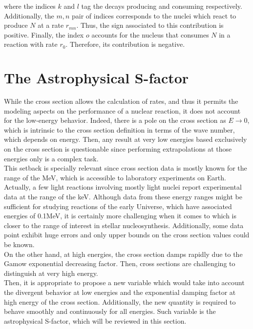 \documentclass[openany]{book}
\begin{document}
where the indices $k$ and $l$ tag the decays producing and consuming respectively. Additionally, the $m, n$ pair of indices corresponds to the nuclei which react to produce $N$ at a rate $r_{mn}$. Thus, the sign associated to this contribution is positive. Finally, the index $o$ accounts for the nucleus that consumes $N$ in a reaction with rate $r_0$. Therefore, its contribution is negative. \\


\section{The Astrophysical S-factor} \label{sec:sFactor}

While the cross section allows the calculation of rates, and thus it permits the modeling aspects on the performance of a nuclear reaction, it does not account for the low-energy behavior. Indeed, there is a pole on the cross section as $E \rightarrow 0$, which is intrinsic to the cross section definition in terms of the wave number, which depends on energy. Then, any result at very low energies based exclusively on the cross section is questionable since performing extrapolations at those energies only is a complex task. \\

This setback is specially relevant since cross section data is mostly known for the range of the MeV, which is accessible to laboratory experiments on Earth. Actually, a few light reactions involving mostly light nuclei report experimental data at the range of the keV. Although data from these energy ranges might be sufficient for studying reactions of the early Universe, which have associated energies of 0.1MeV, it is certainly more challenging when it comes to  which is closer to the range of interest in stellar nucleosynthesis. Additionally, some data point exhibit huge errors and only upper bounds on the cross section values could be known. \\

On the other hand, at high energies, the cross section damps rapidly due to the Gamow exponential decreasing factor. Then, cross sections are challenging to distinguish at very high energy. \\ 

Then, it is appropriate to propose a new variable which would take into account the divergent behavior at low energies and the exponential damping factor at high energy of the cross section. Additionally, the new quantity is required to behave smoothly and continuously for all energies. Such variable is the astrophysical S-factor, which will be reviewed in this section. 
\end{document}
